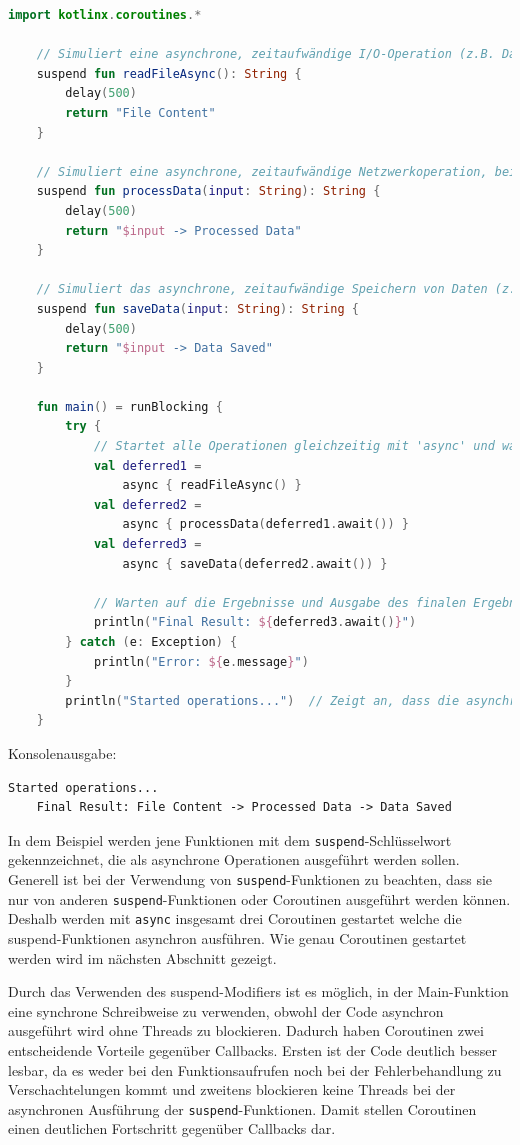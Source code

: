 \documentclass[fontsize=12pt,paper=a4,twoside=semi,parskip=half-,headsepline,headinclude]{scrreprt}
\begin{document}
\begin{lstlisting}[language=Kotlin]
	import kotlinx.coroutines.*

	// Simuliert eine asynchrone, zeitaufwändige I/O-Operation (z.B. Datei lesen)
	suspend fun readFileAsync(): String {
		delay(500)
		return "File Content"
	}

	// Simuliert eine asynchrone, zeitaufwändige Netzwerkoperation, bei der Daten verarbeitet werden (z.B. API-Anfrage)
	suspend fun processData(input: String): String {
		delay(500)
		return "$input -> Processed Data"
	}

	// Simuliert das asynchrone, zeitaufwändige Speichern von Daten (z.B. in einer Datenbank oder Datei)
	suspend fun saveData(input: String): String {
		delay(500)
		return "$input -> Data Saved"
	}

	fun main() = runBlocking {
		try {
			// Startet alle Operationen gleichzeitig mit 'async' und wartet auf deren Ergebnisse
			val deferred1 = 
				async { readFileAsync() }
			val deferred2 = 
				async { processData(deferred1.await()) }
			val deferred3 = 
				async { saveData(deferred2.await()) }
		
			// Warten auf die Ergebnisse und Ausgabe des finalen Ergebnisses
			println("Final Result: ${deferred3.await()}")
		} catch (e: Exception) {
			println("Error: ${e.message}")
		}
		println("Started operations...")  // Zeigt an, dass die asynchronen Operationen gestartet wurden
	}
\end{lstlisting}
Konsolenausgabe:
\begin{lstlisting}[frame=shadowbox, rulecolor=\color{black}, backgroundcolor=\color{gray!10}]
	Started operations...
	Final Result: File Content -> Processed Data -> Data Saved
\end{lstlisting}

In dem Beispiel werden jene Funktionen mit dem \texttt{suspend}-Schlüsselwort gekennzeichnet, die als asynchrone Operationen ausgeführt werden sollen. Generell ist bei der Verwendung von \texttt{suspend}-Funktionen zu beachten, dass sie nur von anderen \texttt{suspend}-Funktionen oder Coroutinen ausgeführt werden können. Deshalb werden mit \texttt{async} insgesamt drei Coroutinen gestartet welche die {suspend}-Funktionen asynchron ausführen. Wie genau Coroutinen gestartet werden wird im nächsten Abschnitt gezeigt.

Durch das Verwenden des suspend-Modifiers ist es möglich, in der Main-Funktion eine synchrone Schreibweise zu verwenden, obwohl der Code asynchron ausgeführt wird ohne Threads zu blockieren. Dadurch haben Coroutinen zwei entscheidende Vorteile gegenüber Callbacks. Ersten ist der Code deutlich besser lesbar, da es weder bei den Funktionsaufrufen noch bei der Fehlerbehandlung zu Verschachtelungen kommt und zweitens blockieren keine Threads bei der asynchronen Ausführung der \texttt{suspend}-Funktionen. Damit stellen Coroutinen einen deutlichen Fortschritt gegenüber Callbacks dar. 
\end{document}

